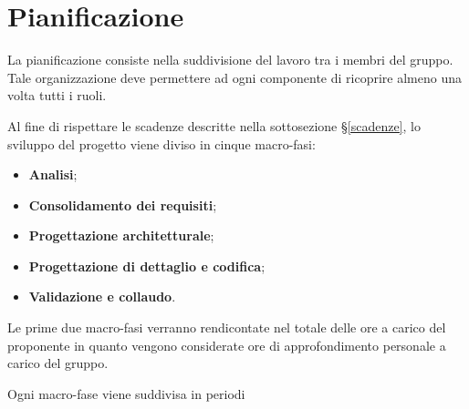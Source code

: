 \documentclass[../piano-di-progetto.tex]{subfiles}
\begin{document}
\section{Pianificazione}
La pianificazione consiste nella suddivisione del lavoro tra i membri del gruppo. Tale organizzazione deve permettere ad ogni componente di ricoprire almeno una volta tutti i ruoli.

Al fine di rispettare le scadenze descritte nella sottosezione \S\ref{scadenze}, lo sviluppo del progetto viene diviso in cinque macro-fasi:
\begin{itemize}
    \item \textbf{Analisi};
    \item \textbf{Consolidamento dei requisiti};
    \item \textbf{Progettazione architetturale};
    \item \textbf{Progettazione di dettaglio e codifica};
    \item \textbf{Validazione e collaudo}.
\end{itemize}
Le prime due macro-fasi verranno rendicontate nel totale delle ore a carico del proponente in quanto vengono considerate ore di approfondimento personale a carico del gruppo.

Ogni macro-fase viene suddivisa in periodi
\end{document}
